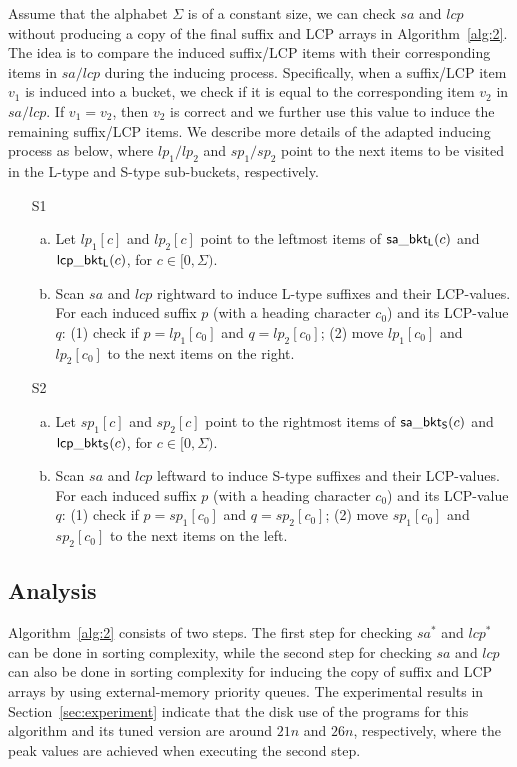 \documentclass[10pt,journal,compsoc]{IEEEtran}
\begin{document}
Assume that the alphabet $\Sigma$ is of a constant size, we can check $sa$ and $lcp$ without producing a copy of the final suffix and LCP arrays in Algorithm~\ref{alg:2}. The idea is to compare the induced suffix/LCP items with their corresponding items in $sa/lcp$ during the inducing process. Specifically, when a suffix/LCP item $v_1$ is induced into a bucket, we check if it is equal to the corresponding item $v_2$ in $sa/lcp$. If $v_1 = v_2$, then $v_2$ is correct and we further use this value to induce the remaining suffix/LCP items. We describe more details of the adapted inducing process as below, where $lp_1/lp_2$ and $sp_1/sp_2$ point to the next items to be visited in the L-type and S-type sub-buckets, respectively. 

\begin{enumerate}
	\item [S1]
	\begin{enumerate}[(a)]
		\item 
		Let $lp_1[c]$ and $lp_2[c]$ point to the leftmost items of ${\sf sa\_bkt_L}(c)$ and ${\sf lcp\_bkt_L}(c)$, for $c \in [0, \Sigma)$.
		\item 
		Scan $sa$ and $lcp$ rightward to induce L-type suffixes and their LCP-values. For each induced suffix $p$ (with a heading character $c_0$) and its LCP-value $q$: (1) check if $p = lp_1[c_0]$ and $q = lp_2[c_0]$; (2) move $lp_1[c_0]$ and $lp_2[c_0]$ to the next items on the right.
	\end{enumerate}
	\item [S2]
	\begin{enumerate}[(a)]
		\item 	
		Let $sp_1[c]$ and $sp_2[c]$ point to the rightmost items of ${\sf sa\_bkt_S}(c)$ and ${\sf lcp\_bkt_S}(c)$, for $c \in [0, \Sigma)$.
		\item 	
		Scan $sa$ and $lcp$ leftward to induce S-type suffixes and their LCP-values. For each induced suffix $p$ (with a heading character $c_0$) and its LCP-value $q$: (1) check if $p = sp_1[c_0]$ and $q = sp_2[c_0]$; (2) move $sp_1[c_0]$ and $sp_2[c_0]$ to the next items on the left.
	\end{enumerate}
\end{enumerate}

\subsection{Analysis} \label{sec:method2:analysis}

Algorithm~\ref{alg:2} consists of two steps. The first step for checking $sa^*$ and $lcp^*$ can be done in sorting complexity, while the second step for checking $sa$ and $lcp$ can also be done in sorting complexity for inducing the copy of suffix and LCP arrays by using external-memory priority queues. The experimental results in Section~\ref{sec:experiment} indicate that the disk use of the programs for this algorithm and its tuned version are around $21n$ and $26n$, respectively, where the peak values are achieved when executing the second step. 
\end{document}
